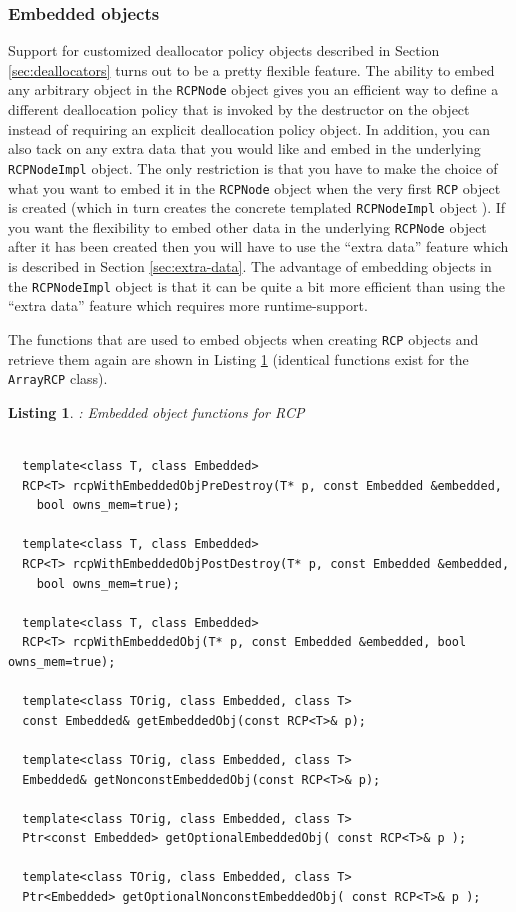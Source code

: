 \documentclass[pdf,ps2pdf,11pt]{SANDreport}
\newtheorem{listing}{Listing}
\begin{document}
%
{}\subsubsection{Embedded objects}
\label{sec:embedded-objecs}
%

Support for customized deallocator policy objects described in Section
{}\ref{sec:deallocators} turns out to be a pretty flexible feature.
The ability to embed any arbitrary object in the {}\texttt{RCPNode}
object gives you an efficient way to define a different deallocation
policy that is invoked by the destructor on the object instead of
requiring an explicit deallocation policy object.  In addition, you
can also tack on any extra data that you would like and embed in the
underlying {}\texttt{RCPNodeImpl} object.  The only restriction is
that you have to make the choice of what you want to embed it in the
{}\texttt{RCPNode} object when the very first {}\texttt{RCP} object is
created (which in turn creates the concrete templated
{}\texttt{RCPNodeImpl} object ).  If you want the flexibility to embed
other data in the underlying {}\texttt{RCPNode} object after it has
been created then you will have to use the ``extra data'' feature
which is described in Section {}\ref{sec:extra-data}.  The advantage
of embedding objects in the {}\texttt{RCPNodeImpl} object is that it
can be quite a bit more efficient than using the ``extra data''
feature which requires more runtime-support.

The functions that are used to embed objects when creating
{}\texttt{RCP} objects and retrieve them again are shown in Listing
{}\ref{listing:RCP-embedded-obj} (identical functions exist for the
{}\texttt{ArrayRCP} class).

\begin{listing}: Embedded object functions for RCP \\
\label{listing:RCP-embedded-obj}
{\small\begin{verbatim}
 
  template<class T, class Embedded>
  RCP<T> rcpWithEmbeddedObjPreDestroy(T* p, const Embedded &embedded,
    bool owns_mem=true);
  
  template<class T, class Embedded>
  RCP<T> rcpWithEmbeddedObjPostDestroy(T* p, const Embedded &embedded,
    bool owns_mem=true);
  
  template<class T, class Embedded>
  RCP<T> rcpWithEmbeddedObj(T* p, const Embedded &embedded, bool owns_mem=true);
  
  template<class TOrig, class Embedded, class T> 
  const Embedded& getEmbeddedObj(const RCP<T>& p);
  
  template<class TOrig, class Embedded, class T>
  Embedded& getNonconstEmbeddedObj(const RCP<T>& p);
  
  template<class TOrig, class Embedded, class T>
  Ptr<const Embedded> getOptionalEmbeddedObj( const RCP<T>& p );
  
  template<class TOrig, class Embedded, class T>
  Ptr<Embedded> getOptionalNonconstEmbeddedObj( const RCP<T>& p );
\end{verbatim}}
\end{listing}
\end{document}
